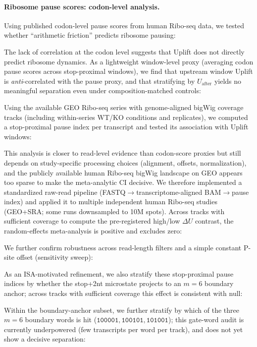 \paragraph{Ribosome pause scores: codon-level analysis.}
Using published codon-level pause scores from human Ribo-seq data, we tested whether ``arithmetic friction'' predicts ribosome pausing:

The lack of correlation at the codon level suggests that Uplift does not directly predict ribosome dynamics.
As a lightweight window-level proxy (averaging codon pause scores across stop-proximal windows), we find that upstream window Uplift is \emph{anti}-correlated with the pause proxy, and that stratifying by $U_{\mathrm{after}}$ yields no meaningful separation even under composition-matched controls:

Using the available GEO Ribo-seq series with genome-aligned bigWig coverage tracks (including within-series WT/KO conditions and replicates), we computed a stop-proximal pause index per transcript and tested its association with Uplift windows:

This analysis is closer to read-level evidence than codon-score proxies but still depends on study-specific processing choices (alignment, offsets, normalization), and the publicly available human Ribo-seq bigWig landscape on GEO appears too sparse to make the meta-analytic CI decisive.
We therefore implemented a standardized raw-read pipeline (FASTQ$\to$transcriptome-aligned BAM$\to$pause index) and applied it to multiple independent human Ribo-seq studies (GEO+SRA; some runs downsampled to 10M spots). Across tracks with sufficient coverage to compute the pre-registered high/low $\Delta U$ contrast, the random-effects meta-analysis is positive and excludes zero:

We further confirm robustness across read-length filters and a simple constant P-site offset (sensitivity sweep):

As an ISA-motivated refinement, we also stratify these stop-proximal pause indices by whether the stop+2nt microstate projects to an $m=6$ boundary anchor; across tracks with sufficient coverage this effect is consistent with null:

Within the boundary-anchor subset, we further stratify by which of the three $m=6$ boundary words is hit ($\texttt{100001},\texttt{100101},\texttt{101001}$); this gate-word audit is currently underpowered (few transcripts per word per track), and does not yet show a decisive separation:
